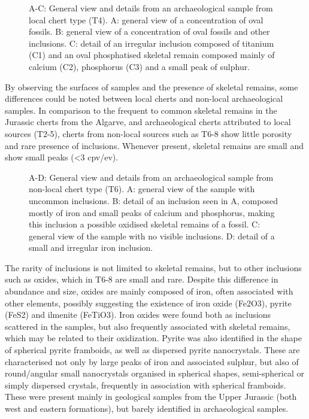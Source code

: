 \documentclass[
  a4paper,
  DIV=11,
  numbers=noendperiod]{scrreprt}
\begin{document}
\begin{figure}


\caption{\label{fig-oval-fossils}A-C: General view and details from an
archaeological sample from local chert type (T4). A: general view of a
concentration of oval fossils. B: general view of a concentration of
oval fossils and other inclusions. C: detail of an irregular inclusion
composed of titanium (C1) and an oval phosphatised skeletal remain
composed mainly of calcium (C2), phosphorus (C3) and a small peak of
sulphur.}

\end{figure}%

By observing the surfaces of samples and the presence of skeletal
remains, some differences could be noted between local cherts and
non-local archaeological samples. In comparison to the frequent to
common skeletal remains in the Jurassic cherts from the Algarve, and
archaeological cherts attributed to local sources (T2-5), cherts from
non-local sources such as T6-8 show little porosity and rare presence of
inclusions. Whenever present, skeletal remains are small and show small
peaks (\textless3 cpv/ev).

\begin{figure}


\caption{\label{fig-t6-general}A-D: General view and details from an
archaeological sample from non-local chert type (T6). A: general view of
the sample with uncommon inclusions. B: detail of an inclusion seen in
A, composed mostly of iron and small peaks of calcium and phosphorus,
making this inclusion a possible oxidised skeletal remains of a fossil.
C: general view of the sample with no visible inclusions. D: detail of a
small and irregular iron inclusion.}

\end{figure}%

The rarity of inclusions is not limited to skeletal remains, but to
other inclusions such as oxides, which in T6-8 are small and rare.
Despite this difference in abundance and size, oxides are mainly
composed of iron, often associated with other elements, possibly
suggesting the existence of iron oxide (Fe2O3), pyrite (FeS2) and
ilmenite (FeTiO3). Iron oxides were found both as inclusions scattered
in the samples, but also frequently associated with skeletal remains,
which may be related to their oxidization. Pyrite was also identified in
the shape of spherical pyrite framboids, as well as dispersed pyrite
nanocrystals. These are characterised not only by large peaks of iron
and associated sulphur, but also of round/angular small nanocrystals
organised in spherical shapes, semi-spherical or simply dispersed
crystals, frequently in association with spherical framboids. These were
present mainly in geological samples from the Upper Jurassic (both west
and eastern formations), but barely identified in archaeological
samples.
\end{document}
